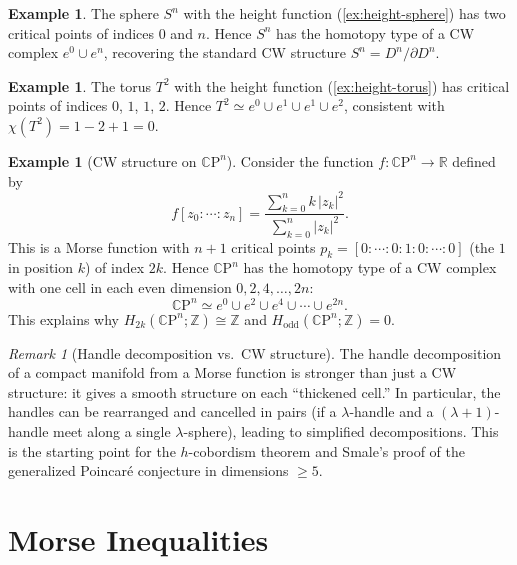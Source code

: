 \documentclass[12pt,a4paper,openany]{book}
\theoremstyle{definition}
\newtheorem{example}[theorem]{Example}
\theoremstyle{remark}
\newtheorem{remark}[theorem]{Remark}
\newcommand{\Z}{\mathbb{Z}}
\newcommand{\R}{\mathbb{R}}
\newcommand{\CP}{\mathbb{C}\mathrm{P}}
\newcommand{\abs}[1]{\left\lvert #1 \right\rvert}
\begin{document}
\begin{example}\label{ex:cw-sphere}
The sphere $S^n$ with the height function (\autoref{ex:height-sphere})
has two critical points of indices $0$ and $n$. Hence $S^n$ has the
homotopy type of a CW complex $e^0 \cup e^n$, recovering the standard
CW structure $S^n = D^n / \partial D^n$.
\end{example}

\begin{example}\label{ex:cw-torus}
The torus $T^2$ with the height function (\autoref{ex:height-torus})
has critical points of indices $0$, $1$, $1$, $2$.
Hence $T^2 \simeq e^0 \cup e^1 \cup e^1 \cup e^2$, consistent with
$\chi(T^2) = 1 - 2 + 1 = 0$.
\end{example}

\begin{example}[CW structure on $\CP^n$]\label{ex:cw-cpn}
Consider the function $f\colon \CP^n \to \R$ defined by
\[
  f[z_0:\cdots:z_n] = \frac{\sum_{k=0}^n k\,\abs{z_k}^2}{\sum_{k=0}^n \abs{z_k}^2}.
\]
This is a Morse function with $n+1$ critical points $p_k = [0:\cdots:0:1:0:\cdots:0]$
(the $1$ in position $k$) of index $2k$. Hence $\CP^n$ has the homotopy
type of a CW complex with one cell in each even dimension $0,2,4,\dots,2n$:
\[
  \CP^n \simeq e^0 \cup e^2 \cup e^4 \cup \cdots \cup e^{2n}.
\]
This explains why $H_{2k}(\CP^n;\Z) \cong \Z$ and
$H_{\mathrm{odd}}(\CP^n;\Z) = 0$.
\end{example}

\begin{remark}[Handle decomposition vs.\ CW structure]\label{rem:handle-vs-cw}
The handle decomposition of a compact manifold from a Morse function is
stronger than just a CW structure: it gives a smooth structure on each
``thickened cell.'' In particular, the handles can be rearranged and
cancelled in pairs (if a $\lambda$-handle and a $(\lambda+1)$-handle
meet along a single $\lambda$-sphere), leading to simplified
decompositions. This is the starting point for the $h$-cobordism theorem
and Smale's proof of the generalized Poincar\'{e} conjecture in
dimensions $\ge 5$.
\end{remark}

\section{Morse Inequalities}\label{sec:morse-inequalities}
\end{document}
